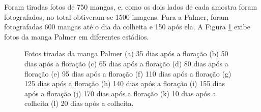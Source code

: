 Foram tiradas fotos de 750 mangas, e, como os dois lados de cada amostra foram fotografados, no total obtiveram-se 1500 imagens. Para a Palmer, foram fotografadas 600 mangas até o dia da colheita e 150 após ela. A Figura \ref{img:palmer_tommy} exibe fotos da manga Palmer em diferentes estádios.

\begin{figure}[H]
\centering
    \caption{\label{img:palmer_tommy} Fotos tiradas da manga Palmer (a) 35 dias após a floração (b) 50 dias após a floração (c) 65 dias após a floração (d) 80 dias após a floração (e) 95 dias após a floração (f) 110 dias após a floração (g) 125 dias após a floração (h) 140 dias após a floração (i) 155 dias após a floração (j) 170 dias após a floração (k) 10 dias após a colheita (l) 20 dias após a colheita.}

\end{figure}
